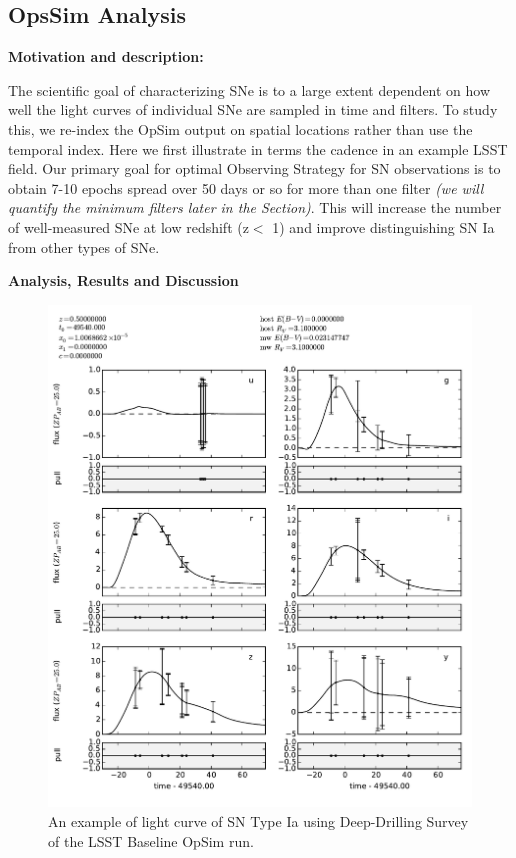 
\subsection{OpsSim Analysis}
\label{sec:keyword:analysis}

{\bf Motivation and description:}

The scientific goal of characterizing SNe is to a large extent dependent on
how well the light curves of individual SNe are sampled in time and filters. To study
this, we re-index the OpSim output on spatial locations rather than use the temporal
index. Here we first
illustrate  in terms the cadence in an example LSST field. Our primary goal for optimal Observing
Strategy for SN observations is to obtain 7-10 epochs spread over 50 days or so for more than one filter {\it (we
will quantify the minimum filters later in the Section)}. This will increase the number of
well-measured SNe at low redshift (z$<$ 1) and improve distinguishing SN Ia from other
types of SNe.

{\bf Analysis, Results and Discussion}


\begin{figure}[tbh!]
\includegraphics[angle=0,width=0.99\hsize:,clip]{figs/SN_290_lc.pdf}
\caption{An example of light curve of SN Type Ia using Deep-Drilling Survey of the LSST Baseline OpSim run.
}
\label{fig:SNIaLCopsimdeep}
\end{figure}




